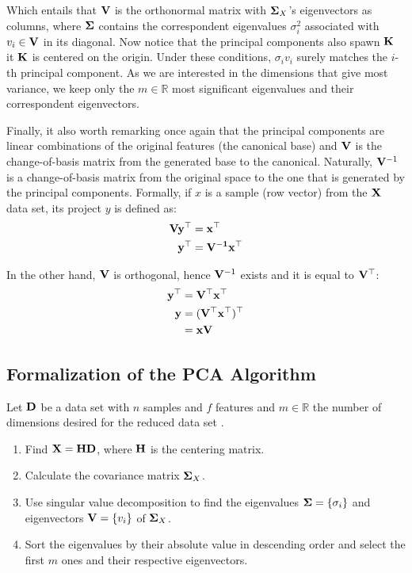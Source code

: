 Which entails that $\mathbf{V}$ is the orthonormal matrix with $\mathbf{\Sigma}_X$'s eigenvectors as columns, where $\mathbf{\Sigma}$ contains the correspondent eigenvalues $\sigma_i^2$ associated with $v_i\in \mathbf{V}$ in its diagonal. Now notice that the principal components also spawn $\mathbf{K}$ it $\mathbf{K}$ is centered on the origin. Under these conditions, $\sigma_i v_i$ surely matches the $i$-th principal component. As we are interested in the dimensions that give most variance, we keep only the $m\in\mathbb{R}$ most significant eigenvalues and their correspondent eigenvectors.

Finally, it also worth remarking once again that the principal components are linear combinations of the original features (the canonical base) and $\mathbf{V}$ is the change-of-basis matrix from the generated base to the canonical. Naturally, $\mathbf{V}^{-1}$ is a change-of-basis matrix from the original space to the one that is generated by the principal components. Formally, if $x$ is a sample (row vector) from the $\mathbf{X}$ data set, its project $y$ is defined as:
\begin{align*}
	\mathbf{V y^\top} &= \mathbf{x}^\top \\
	\mathbf{y}^\top  &= \mathbf{V^{-1}x^\top}
\end{align*}

In the other hand, $\mathbf{V}$ is orthogonal, hence $\mathbf{V}^{-1}$ exists and it is equal to $\mathbf{V}^\top$:
\begin{align*}
	\mathbf{y}^\top &= \mathbf{V^\top x^\top} \\
	\mathbf{y} &= \mathbf{(V^\top x^\top)^\top} \\
      &= \mathbf{xV}
\end{align*}

\subsection{Formalization of the PCA Algorithm}

Let $\mathbf{D}$ be a data set with $n$ samples and $f$ features and $m\in\mathbb{R}$ the number of dimensions desired for the reduced data set \cite{pca2002, pcapy}.

\begin{enumerate}
	\item Find $\mathbf{X=HD}$, where $\mathbf{H}$ is the centering matrix.

	\item Calculate the covariance matrix $\mathbf{\Sigma}_X$.

	\item Use singular value decomposition to find the eigenvalues $\mathbf{\Sigma} = \{\sigma_i\}$ and eigenvectors $\mathbf{V} = \{v_i\}$ of $\mathbf{\Sigma}_X$.

	\item Sort the eigenvalues by their absolute value in descending order and select the first $m$ ones and their respective eigenvectors.
\end{enumerate}

